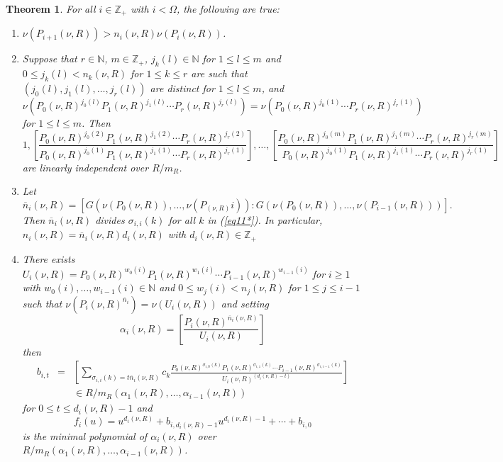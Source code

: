 \documentclass[11pt]{amsart}
\def\NZQ{\mathbb}               %
\def\NN{{\NZQ N}}
\def\ZZ{{\NZQ Z}}
\newtheorem{Theorem}{Theorem}[section]
\begin{document}
\begin{Theorem}
 For all $i\in\ZZ_+$ with $i<\Omega$, the following are true:
 \begin{enumerate}
 \item[1)] $\nu(P_{i+1}(\nu,R))>n_i(\nu,R)\nu(P_i(\nu,R))$.
 \item[2)] Suppose that $r\in\NN$, $m\in \ZZ_+$, $j_k(l)\in\NN$  for $1\le l\le m$ and $0\le j_k(l)<n_k(\nu,R)$ for $1\le k\le r$ are such that  $(j_0(l),j_1(l),\ldots,j_r(l))$ are distinct for $1\le l\le m$, and 
 $$
 \nu(P_0(\nu,R)^{j_0(l)}P_1(\nu,R)^{j_1(l)}\cdots P_r(\nu,R)^{j_r(l)})=\nu(P_0(\nu,R)^{j_0(1)}\cdots P_r(\nu,R)^{j_r(1)})
 $$
 for $1\le l\le m$.
 Then
 $$
 1,\left[\frac{P_0(\nu,R)^{j_0(2)}P_1(\nu,R)^{j_1(2)}\cdots P_r(\nu,R)^{j_r(2)}}{P_0(\nu,R)^{j_0(1)}P_1(\nu,R)^{j_1(1)}\cdots P_r(\nu,R)^{j_r(1)}}\right],
 \ldots,
 \left[\frac{P_0(\nu,R)^{j_0(m)}P_1(\nu,R)^{j_1(m)}\cdots P_r(\nu,R)^{j_r(m)}}{P_0(\nu,R)^{j_0(1)}P_1(\nu,R)^{j_1(1)}\cdots P_r(\nu,R)^{j_r(1)}}\right]
 $$
 are linearly independent over $R/ m_R$.
 \item[3)] Let 
 $$
 \overline n_i(\nu,R)=[G(\nu(P_0(\nu,R)),\ldots, \nu(P_(\nu,R)i)):G(\nu(P_0(\nu,R)),\ldots, \nu(P_{i-1}(\nu,R)))].
 $$
  Then $\overline n_i(\nu,R)$ divides $\sigma_{i,i}(k)$ for all $k$ in (\ref{eq11*}). In particular, $n_i(\nu,R)=\overline n_i(\nu,R)d_i(\nu,R)$ with $d_i(\nu,R)\in \ZZ_+$ 
 \item[4)] There exists $U_i(\nu,R)=P_0(\nu,R)^{w_0(i)}P_1(\nu,R)^{w_1(i)}\cdots P_{i-1}(\nu,R)^{w_{i-1}(i)}$ for $i\ge 1$ with $w_0(i),\ldots, w_{i-1}(i)\in\NN$ 
 and $0\le w_j(i)<n_j(\nu,R)$ for $1\le j\le i-1$ such that
 $\nu(P_i(\nu,R)^{\overline n_i})=\nu(U_i(\nu,R))$ and setting
 $$
 \alpha_i(\nu,R)=\left[\frac{P_i(\nu,R)^{\overline n_i(\nu,R)}}{U_i(\nu,R)}\right]
 $$
 then 
 $$
 \begin{array}{lll}
 b_{i,t}&=&\left[\sum_{\sigma_{i,i}(k)=t\overline n_i(\nu,R)}c_k\frac{P_0(\nu,R)^{\sigma_{i,0}(k)}P_1(\nu,R)^{\sigma_{i,1}(k)}\cdots P_{i-1}(\nu,R)^{\sigma_{i,i-1}(k)}} {U_i(\nu,R)^{(d_i(\nu,R)-t)}}\right]\\
 &&\in R/m_R(\alpha_1(\nu,R),\ldots,\alpha_{i-1}(\nu,R))
 \end{array}
 $$
 for $0\le t\le d_i(\nu,R)-1$ and
 $$
 f_i(u)=u^{d_i(\nu,R)}+b_{i,d_i(\nu,R)-1}u^{d_i(\nu,R)-1}+\cdots+b_{i,0}
 $$
 is the minimal polynomial of $\alpha_i(\nu,R)$ over $R/m_R(\alpha_1(\nu,R),\ldots,\alpha_{i-1}(\nu,R))$.
 
\end{enumerate}


\end{Theorem}
\end{document}
